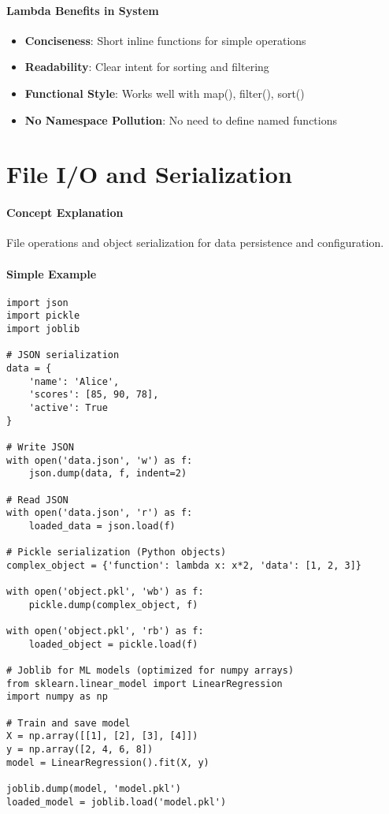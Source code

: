 \paragraph{Lambda Benefits in System}
\begin{itemize}
\item \textbf{Conciseness}: Short inline functions for simple operations
\item \textbf{Readability}: Clear intent for sorting and filtering
\item \textbf{Functional Style}: Works well with map(), filter(), sort()
\item \textbf{No Namespace Pollution}: No need to define named functions
\end{itemize}

\section{File I/O and Serialization}

\paragraph{Concept Explanation}
File operations and object serialization for data persistence and configuration.

\paragraph{Simple Example}
\begin{lstlisting}[caption=File I/O and Serialization Examples]
import json
import pickle
import joblib

# JSON serialization
data = {
    'name': 'Alice',
    'scores': [85, 90, 78],
    'active': True
}

# Write JSON
with open('data.json', 'w') as f:
    json.dump(data, f, indent=2)

# Read JSON
with open('data.json', 'r') as f:
    loaded_data = json.load(f)

# Pickle serialization (Python objects)
complex_object = {'function': lambda x: x*2, 'data': [1, 2, 3]}

with open('object.pkl', 'wb') as f:
    pickle.dump(complex_object, f)

with open('object.pkl', 'rb') as f:
    loaded_object = pickle.load(f)

# Joblib for ML models (optimized for numpy arrays)
from sklearn.linear_model import LinearRegression
import numpy as np

# Train and save model
X = np.array([[1], [2], [3], [4]])
y = np.array([2, 4, 6, 8])
model = LinearRegression().fit(X, y)

joblib.dump(model, 'model.pkl')
loaded_model = joblib.load('model.pkl')
\end{lstlisting}

